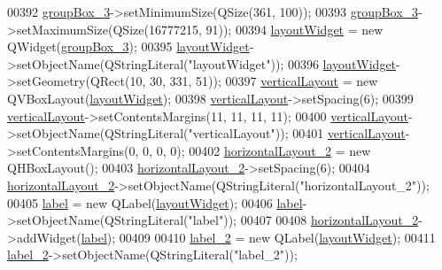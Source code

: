 \begin{DoxyCode}
00392         \hyperlink{a00080_a320d3d7ba1cb8fff7b7b95923ed10f5e}{groupBox\_3}->setMinimumSize(QSize(361, 100));
00393         \hyperlink{a00080_a320d3d7ba1cb8fff7b7b95923ed10f5e}{groupBox\_3}->setMaximumSize(QSize(16777215, 91));
00394         \hyperlink{a00080_ab96ab0f0578098521fa69a75aa5cdde8}{layoutWidget} = \textcolor{keyword}{new} QWidget(\hyperlink{a00080_a320d3d7ba1cb8fff7b7b95923ed10f5e}{groupBox\_3});
00395         \hyperlink{a00080_ab96ab0f0578098521fa69a75aa5cdde8}{layoutWidget}->setObjectName(QStringLiteral(\textcolor{stringliteral}{"layoutWidget"}));
00396         \hyperlink{a00080_ab96ab0f0578098521fa69a75aa5cdde8}{layoutWidget}->setGeometry(QRect(10, 30, 331, 51));
00397         \hyperlink{a00080_aecd96a04789fcfec3f98d80390ad8184}{verticalLayout} = \textcolor{keyword}{new} QVBoxLayout(\hyperlink{a00080_ab96ab0f0578098521fa69a75aa5cdde8}{layoutWidget});
00398         \hyperlink{a00080_aecd96a04789fcfec3f98d80390ad8184}{verticalLayout}->setSpacing(6);
00399         \hyperlink{a00080_aecd96a04789fcfec3f98d80390ad8184}{verticalLayout}->setContentsMargins(11, 11, 11, 11);
00400         \hyperlink{a00080_aecd96a04789fcfec3f98d80390ad8184}{verticalLayout}->setObjectName(QStringLiteral(\textcolor{stringliteral}{"verticalLayout"}));
00401         \hyperlink{a00080_aecd96a04789fcfec3f98d80390ad8184}{verticalLayout}->setContentsMargins(0, 0, 0, 0);
00402         \hyperlink{a00080_a80867018070156432923d0266cc9fe25}{horizontalLayout\_2} = \textcolor{keyword}{new} QHBoxLayout();
00403         \hyperlink{a00080_a80867018070156432923d0266cc9fe25}{horizontalLayout\_2}->setSpacing(6);
00404         \hyperlink{a00080_a80867018070156432923d0266cc9fe25}{horizontalLayout\_2}->setObjectName(QStringLiteral(\textcolor{stringliteral}{"horizontalLayout\_2"}));
00405         \hyperlink{a00080_ad9c89133780f28e6efa2ec17ceb9cff5}{label} = \textcolor{keyword}{new} QLabel(\hyperlink{a00080_ab96ab0f0578098521fa69a75aa5cdde8}{layoutWidget});
00406         \hyperlink{a00080_ad9c89133780f28e6efa2ec17ceb9cff5}{label}->setObjectName(QStringLiteral(\textcolor{stringliteral}{"label"}));
00407 
00408         \hyperlink{a00080_a80867018070156432923d0266cc9fe25}{horizontalLayout\_2}->addWidget(\hyperlink{a00080_ad9c89133780f28e6efa2ec17ceb9cff5}{label});
00409 
00410         \hyperlink{a00080_a2e2516d755e4dd53fc905dabddf2738a}{label\_2} = \textcolor{keyword}{new} QLabel(\hyperlink{a00080_ab96ab0f0578098521fa69a75aa5cdde8}{layoutWidget});
00411         \hyperlink{a00080_a2e2516d755e4dd53fc905dabddf2738a}{label\_2}->setObjectName(QStringLiteral(\textcolor{stringliteral}{"label\_2"}));

\end{DoxyCode}
